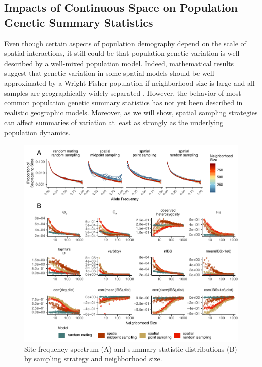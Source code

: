 \documentclass[11pt,twoside,lineno]{preprint}
\begin{document}
\subsection{Impacts of Continuous Space on Population Genetic Summary Statistics}

Even though certain aspects of population demography depend on the scale of spatial interactions,
it still could be that population genetic variation is well-described by a well-mixed population model.
Indeed, mathematical results suggest that genetic variation in some spatial models should be well-approximated by a Wright-Fisher population
if neighborhood size is large and all samples are geographically widely separated \citep{wilkins2004separation,zahle2005stepping}.
However, the behavior of most common population genetic summary statistics has not yet been described in realistic geographic models.
Moreover, as we will show, spatial sampling strategies can affect summaries of variation at least as strongly as the underlying population dynamics. 


\begin{figure}[p]
\centering
\includegraphics[width=\textwidth]{figures/sfs_w_sumstats.pdf}
\caption{Site frequency spectrum (A) and summary statistic distributions (B) by sampling strategy and neighborhood size.}
\label{fig:sumstats}
\end{figure}
\end{document}
